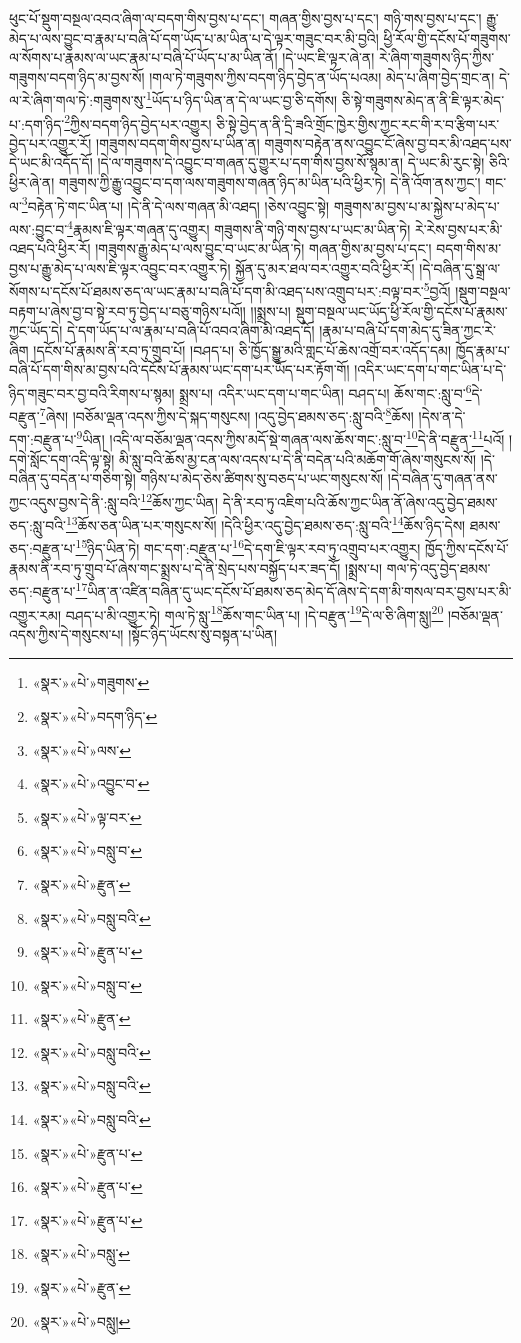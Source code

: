 ཕུང་པོ་སྡུག་བསྔལ་འབའ་ཞིག་ལ་བདག་གིས་བྱས་པ་དང་། གཞན་གྱིས་བྱས་པ་དང་། གཉི་གས་བྱས་པ་དང་། རྒྱུ་མེད་པ་ལས་བྱུང་བ་རྣམ་པ་བཞི་པོ་དག་ཡོད་པ་མ་ཡིན་པ་དེ་ལྟར་གཟུང་བར་མི་བྱའི། ཕྱི་རོལ་གྱི་དངོས་པོ་གཟུགས་ལ་སོགས་པ་རྣམས་ལ་ཡང་རྣམ་པ་བཞི་པོ་ཡོད་པ་མ་ཡིན་ནོ། །དེ་ཡང་ཇི་ལྟར་ཞེ་ན། རེ་ཞིག་གཟུགས་ཉིད་ཀྱིས་གཟུགས་བདག་ཉིད་མ་བྱས་སོ། །གལ་ཏེ་གཟུགས་ཀྱིས་བདག་ཉིད་བྱེད་ན་ཡོད་པའམ། མེད་པ་ཞིག་བྱེད་གྲང་ན། དེ་ལ་རེ་ཞིག་གལ་ཏེ་:གཟུགས་སུ་\footnote{«སྣར་»«པེ་»གཟུགས་}ཡོད་པ་ཉིད་ཡིན་ན་དེ་ལ་ཡང་བྱ་ཅི་དགོས། ཅི་སྟེ་གཟུགས་མེད་ན་ནི་ཇི་ལྟར་མེད་པ་:དག་ཉིད་\footnote{«སྣར་»«པེ་»བདག་ཉིད་}ཀྱིས་བདག་ཉིད་བྱེད་པར་འགྱུར། ཅི་སྟེ་བྱེད་ན་ནི་དྲི་ཟའི་གྲོང་ཁྱེར་གྱིས་ཀྱང་རང་གི་ར་བ་རྩིག་པར་བྱེད་པར་འགྱུར་རོ། །གཟུགས་བདག་གིས་བྱས་པ་ཡིན་ན། གཟུགས་བརྟེན་ནས་འབྱུང་ངོ་ཞེས་བྱ་བར་མི་འཐད་པས་དེ་ཡང་མི་འདོད་དོ། །དེ་ལ་གཟུགས་དེ་འབྱུང་བ་གཞན་དུ་གྱུར་པ་དག་གིས་བྱས་སོ་སྙམ་ན། དེ་ཡང་མི་རུང་སྟེ། ཅིའི་ཕྱིར་ཞེ་ན། གཟུགས་ཀྱི་རྒྱུ་འབྱུང་བ་དག་ལས་གཟུགས་གཞན་ཉིད་མ་ཡིན་པའི་ཕྱིར་ཏེ། དེ་ནི་འོག་ནས་ཀྱང་། གང་ལ་\footnote{«སྣར་»«པེ་»ལས་}བརྟེན་ཏེ་གང་ཡིན་པ། །དེ་ནི་དེ་ལས་གཞན་མི་འཐད། །ཅེས་འབྱུང་སྟེ། གཟུགས་མ་བྱས་པ་མ་སྐྱེས་པ་མེད་པ་ལས་:བྱུང་བ་\footnote{«སྣར་»«པེ་»འབྱུང་བ་}རྣམས་ཇི་ལྟར་གཞན་དུ་འགྱུར། གཟུགས་ནི་གཉི་གས་བྱས་པ་ཡང་མ་ཡིན་ཏེ། རེ་རེས་བྱས་པར་མི་འཐད་པའི་ཕྱིར་རོ། །གཟུགས་རྒྱུ་མེད་པ་ལས་བྱུང་བ་ཡང་མ་ཡིན་ཏེ། གཞན་གྱིས་མ་བྱས་པ་དང་། བདག་གིས་མ་བྱས་པ་རྒྱུ་མེད་པ་ལས་ཇི་ལྟར་འབྱུང་བར་འགྱུར་ཏེ། སྐྱོན་དུ་མར་ཐལ་བར་འགྱུར་བའི་ཕྱིར་རོ། །དེ་བཞིན་དུ་སྒྲ་ལ་སོགས་པ་དངོས་པོ་ཐམས་ཅད་ལ་ཡང་རྣམ་པ་བཞི་པོ་དག་མི་འཐད་པས་འགྲུབ་པར་:བལྟ་བར་\footnote{«སྣར་»«པེ་»ལྟ་བར་}བྱའོ། །སྡུག་བསྔལ་བརྟག་པ་ཞེས་བྱ་བ་སྟེ་རབ་ཏུ་བྱེད་པ་བཅུ་གཉིས་པའོ།། །།སྨྲས་པ། སྡུག་བསྔལ་ཡང་ཡོད་ཕྱི་རོལ་གྱི་དངོས་པོ་རྣམས་ཀྱང་ཡོད་དེ། དེ་དག་ཡོད་པ་ལ་རྣམ་པ་བཞི་པོ་འབའ་ཞིག་མི་འཐད་དོ། །རྣམ་པ་བཞི་པོ་དག་མེད་དུ་ཟིན་ཀྱང་རེ་ཞིག །དངོས་པོ་རྣམས་ནི་རབ་ཏུ་གྲུབ་པོ། །བཤད་པ། ཅི་ཁྱོད་སྒྱུ་མའི་གླང་པོ་ཆེས་འགྲོ་བར་འདོད་དམ། ཁྱོད་རྣམ་པ་བཞི་པོ་དག་གིས་མ་བྱས་པའི་དངོས་པོ་རྣམས་ཡང་དག་པར་ཡོད་པར་རྟོག་གོ། །འདིར་ཡང་དག་པ་གང་ཡིན་པ་དེ་ཉིད་གཟུང་བར་བྱ་བའི་རིགས་པ་སྙམ། སྨྲས་པ། འདིར་ཡང་དག་པ་གང་ཡིན། བཤད་པ། ཆོས་གང་:སླུ་བ་\footnote{«སྣར་»«པེ་»བསླུ་བ་}དེ་བརྫུན་\footnote{«སྣར་»«པེ་»རྫུན་}ཞེས། །བཅོམ་ལྡན་འདས་ཀྱིས་དེ་སྐད་གསུངས། །འདུ་བྱེད་ཐམས་ཅད་:སླུ་བའི་\footnote{«སྣར་»«པེ་»བསླུ་བའི་}ཆོས། །དེས་ན་དེ་དག་:བརྫུན་པ་\footnote{«སྣར་»«པེ་»རྫུན་པ་}ཡིན། །འདི་ལ་བཅོམ་ལྡན་འདས་ཀྱིས་མདོ་སྡེ་གཞན་ལས་ཆོས་གང་:སླུ་བ་\footnote{«སྣར་»«པེ་»བསླུ་བ་}དེ་ནི་བརྫུན་\footnote{«སྣར་»«པེ་»རྫུན་}པའོ། །དགེ་སློང་དག་འདི་ལྟ་སྟེ། མི་སླུ་བའི་ཆོས་མྱ་ངན་ལས་འདས་པ་དེ་ནི་བདེན་པའི་མཆོག་གོ་ཞེས་གསུངས་སོ། །དེ་བཞིན་དུ་བདེན་པ་གཅིག་སྟེ། གཉིས་པ་མེད་ཅེས་ཚིགས་སུ་བཅད་པ་ཡང་གསུངས་སོ། །དེ་བཞིན་དུ་གཞན་ནས་ཀྱང་འདུས་བྱས་དེ་ནི་:སླུ་བའི་\footnote{«སྣར་»«པེ་»བསླུ་བའི་}ཆོས་ཀྱང་ཡིན། དེ་ནི་རབ་ཏུ་འཇིག་པའི་ཆོས་ཀྱང་ཡིན་ནོ་ཞེས་འདུ་བྱེད་ཐམས་ཅད་:སླུ་བའི་\footnote{«སྣར་»«པེ་»བསླུ་བའི་}ཆོས་ཅན་ཡིན་པར་གསུངས་སོ། །དེའི་ཕྱིར་འདུ་བྱེད་ཐམས་ཅད་:སླུ་བའི་\footnote{«སྣར་»«པེ་»བསླུ་བའི་}ཆོས་ཉིད་དེས། ཐམས་ཅད་:བརྫུན་པ་\footnote{«སྣར་»«པེ་»རྫུན་པ་}ཉིད་ཡིན་ཏེ། གང་དག་:བརྫུན་པ་\footnote{«སྣར་»«པེ་»རྫུན་པ་}དེ་དག་ཇི་ལྟར་རབ་ཏུ་འགྲུབ་པར་འགྱུར། ཁྱོད་ཀྱིས་དངོས་པོ་རྣམས་ནི་རབ་ཏུ་གྲུབ་པོ་ཞེས་གང་སྨྲས་པ་དེ་ནི་སྲེད་པས་བསྐྱོད་པར་ཟད་དོ། །སྨྲས་པ། གལ་ཏེ་འདུ་བྱེད་ཐམས་ཅད་:བརྫུན་པ་\footnote{«སྣར་»«པེ་»རྫུན་པ་}ཡིན་ན་འཛིན་བཞིན་དུ་ཡང་དངོས་པོ་ཐམས་ཅད་མེད་དོ་ཞེས་དེ་དག་མི་གསལ་བར་བྱས་པར་མི་འགྱུར་རམ། བཤད་པ་མི་འགྱུར་ཏེ། གལ་ཏེ་སླུ་\footnote{«སྣར་»«པེ་»བསླུ་}ཆོས་གང་ཡིན་པ། །དེ་བརྫུན་\footnote{«སྣར་»«པེ་»རྫུན་}དེ་ལ་ཅི་ཞིག་སླུ།\footnote{«སྣར་»«པེ་»བསླུ།} །བཅོམ་ལྡན་འདས་ཀྱིས་དེ་གསུངས་པ། །སྟོང་ཉིད་ཡོངས་སུ་བསྟན་པ་ཡིན། 
